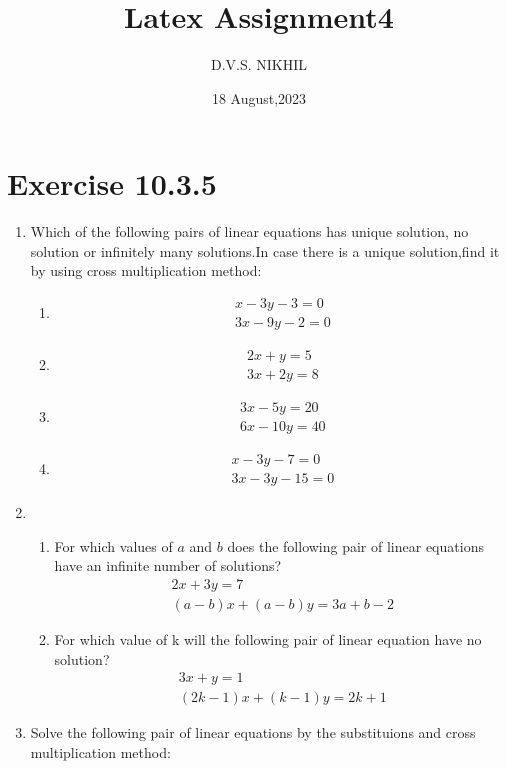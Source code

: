 \documentclass{article}
\theoremstyle{remark}
\begin{document}
\title{Latex Assignment4}
\author{D.V.S. NIKHIL}
\date{18 August,2023}
\maketitle
\section*{Exercise 10.3.5}
\begin{enumerate}
\item Which of the following pairs of linear equations has unique solution, no solution or infinitely many solutions.In case there is a unique solution,find it by using cross multiplication method:
  \begin{enumerate}[label=(\roman*)]
	\item \begin{align}
	x-3y-3=0\\
	3x-9y-2=0
        \end{align}
       \item \begin{align}
	2x+y=5\\
	3x+2y=8
	\end{align}
	\item \begin{align}
	3x-5y=20\\
	6x-10y=40
	\end{align}
	\item \begin{align}
	x-3y-7=0\\
	3x-3y-15=0
        \end{align}
 \end{enumerate}
\item 
  \begin{enumerate}[label=(\roman*)]
  \item For which values of $a$ and $b$ does the following pair of linear equations have an infinite number of solutions?
	\begin{align}
	2x+3y=7\\
	(a-b)x+(a-b)y=3a+b-2
	\end{align}
  \item For which value of k will the following pair of linear equation have no solution?
	\begin{align}
	3x+y=1\\
	(2k-1)x+(k-1)y=2k+1
	\end{align}
   \end{enumerate}
\item Solve the following pair of linear equations by the substituions and cross multiplication method:

\end{enumerate}
\end{document}
